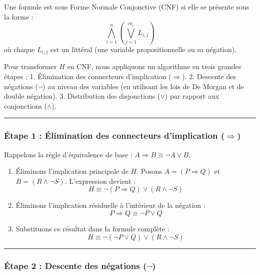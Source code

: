 \documentclass[11pt,a4paper]{article}
\begin{document}
Une formule est sous Forme Normale Conjonctive (CNF) si elle se présente
sous la forme :
\[\bigwedge_{i=1}^n \left( \bigvee_{j=1}^{m_i} L_{i,j} \right)\] où
chaque \(L_{i,j}\) est un littéral (une variable propositionnelle ou sa
négation).

Pour transformer \(H\) en CNF, nous appliquons un algorithme en trois
grandes étapes : 1. Élimination des connecteurs d'implication
(\(\Rightarrow\)). 2. Descente des négations (\(\neg\)) au niveau des
variables (en utilisant les lois de De Morgan et de double négation). 3.
Distribution des disjonctions (\(\lor\)) par rapport aux conjonctions
(\(\land\)).

\begin{center}\rule{0.5\linewidth}{0.5pt}\end{center}

\hypertarget{uxe9tape-1-uxe9limination-des-connecteurs-dimplication-rightarrow}{%
\subsubsection{\texorpdfstring{Étape 1 : Élimination des connecteurs
d'implication
(\(\Rightarrow\))}{Étape 1 : Élimination des connecteurs d'implication (\textbackslash Rightarrow)}}\label{uxe9tape-1-uxe9limination-des-connecteurs-dimplication-rightarrow}}

Rappelons la règle d'équivalence de base :
\(A \Rightarrow B \equiv \neg A \lor B\).

\begin{enumerate}
\def\labelenumi{\arabic{enumi}.}
\tightlist
\item
  Éliminons l'implication principale de \(H\). Posons
  \(A = (P \Rightarrow Q)\) et \(B = (R \land \neg S)\). L'expression
  devient : \[H \equiv \neg(P \Rightarrow Q) \lor (R \land \neg S)\]
\item
  Éliminons l'implication résiduelle à l'intérieur de la négation :
  \[P \Rightarrow Q \equiv \neg P \lor Q\]
\item
  Substituons ce résultat dans la formule complète :
  \[H \equiv \neg(\neg P \lor Q) \lor (R \land \neg S)\]
\end{enumerate}

\begin{center}\rule{0.5\linewidth}{0.5pt}\end{center}

\hypertarget{uxe9tape-2-descente-des-nuxe9gations-neg}{%
\subsubsection{\texorpdfstring{Étape 2 : Descente des négations
(\(\neg\))}{Étape 2 : Descente des négations (\textbackslash neg)}}\label{uxe9tape-2-descente-des-nuxe9gations-neg}}
\end{document}

